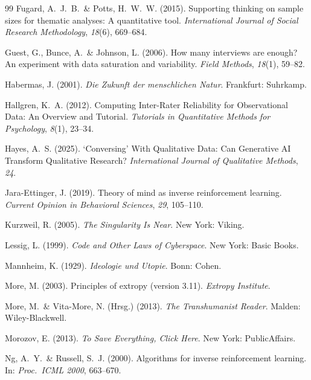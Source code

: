 \documentclass[12pt,a4paper]{article}
\begin{document}
\begin{thebibliography}{99}
  Fugard, A.~J.~B.~\& Potts, H.~W.~W. (2015).
  Supporting thinking on sample sizes for thematic analyses: A quantitative tool.
  \textit{International Journal of Social Research Methodology}, \textit{18}(6), 669--684.

  Guest, G., Bunce, A.~\& Johnson, L. (2006).
  How many interviews are enough? An experiment with data saturation and variability.
  \textit{Field Methods}, \textit{18}(1), 59--82.

  Habermas, J. (2001).
  \textit{Die Zukunft der menschlichen Natur}.
  Frankfurt: Suhrkamp.

  Hallgren, K.~A. (2012).
  Computing Inter-Rater Reliability for Observational Data: An Overview and Tutorial.
  \textit{Tutorials in Quantitative Methods for Psychology}, \textit{8}(1), 23--34.

  Hayes, A.~S. (2025).
  `Conversing' With Qualitative Data: Can Generative AI Transform Qualitative Research?
  \textit{International Journal of Qualitative Methods}, \textit{24}.

  Jara-Ettinger, J. (2019).
  Theory of mind as inverse reinforcement learning.
  \textit{Current Opinion in Behavioral Sciences}, \textit{29}, 105--110.

  Kurzweil, R. (2005).
  \textit{The Singularity Is Near}.
  New York: Viking.

  Lessig, L. (1999).
  \textit{Code and Other Laws of Cyberspace}.
  New York: Basic Books.

  Mannheim, K. (1929).
  \textit{Ideologie und Utopie}.
  Bonn: Cohen.

  More, M. (2003).
  Principles of extropy (version 3.11).
  \textit{Extropy Institute}.

  More, M.~\& Vita-More, N. (Hrsg.) (2013).
  \textit{The Transhumanist Reader}.
  Malden: Wiley-Blackwell.

  Morozov, E. (2013).
  \textit{To Save Everything, Click Here}.
  New York: PublicAffairs.

  Ng, A.~Y.~\& Russell, S.~J. (2000).
  Algorithms for inverse reinforcement learning.
  In: \textit{Proc.\ ICML 2000}, 663--670.


\end{thebibliography}
\end{document}
